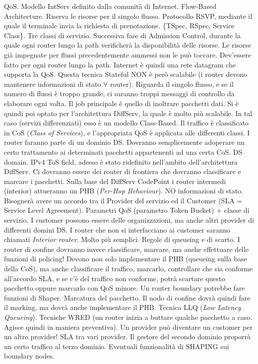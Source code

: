QoS. Modello IntServ definito dalla comunità di Internet. Flow-Based Architecture. Riserva le risorse per il singolo flusso. Protocollo RSVP, mediante il quale il terminale invia la richiesta di prenotazione. \{TSpec, RSpec, Service Class\}. Tre classi di servizio. Successiva fase di Admission Control, durante la quale ogni router lungo la path verificherà la disponibilità delle risorse. Le risorse già impegnate per flussi precedentemente ammessi non le può toccare. Dev'essere fatto per ogni router lungo la path. Internet è quindi una rete datagram che supporta la QoS. Questa tecnica Stateful NON è però scalabile (i router devono mantenere informazioni di stato $\forall$ router). Riguarda il singolo flusso, e se il numero di flussi è troppo grande, ci saranno troppi messaggi di controllo da elaborare ogni volta. Il job principale è quello di inoltrare pacchetti dati. Si è quindi poi optato per l'architettura DiffServ, la quale è molto più scalabile. In tal caso (servizi differenziati) esso è un modello Class-Based. Il traffico è classificato in CoS (\textit{Class of Services}), e l'appropriata QoS è applicata alle differenti classi. I router faranno parte di un dominio DS. Dovranno semplicemente adoperare un certo trattamento ai determinati pacchetti appartenenti ad una certa CoS. DS domain. IPv4 ToS field, adesso è stato ridefinito nell'ambito dell'architettura DiffServ. Ci dovranno essere dei router di frontiera che dovranno classificare e marcare i pacchetti. Sulla base del DiffServ CodePoint i router intermedi (interior) attueranno un PHB (\textit{Per-Hop Behaviour}). NO informazioni di stato. Bisognerà avere un accordo tra il Provider del servizio ed il Customer (SLA = Service Level Agreement). Parametri QoS (parametro Token Bucket) + classe di servizio. I customer possono essere delle organizzazioni, ma anche altri provider di differenti domini DS. I router che non si interfacciano ai customer saranno chiamati \textit{Interior router}. Molto più semplici. Regole di queueing e di scarto. I router di confine dovranno invece classificare, marcare, ma anche effettuare delle funzioni di policing! Devono non solo implementare il PHB (queueing sulla base della CoS), ma anche classificare il traffico, marcarlo, controllare che sia conforme all'accordo SLA, e se c'è del traffico non conforme, potrà scartare questo pacchetto oppure marcarlo con QoS minore. Un router boundary potrebbe fare funzioni di Shaper. Marcatura del pacchetto. Il nodo di confine dovrà quindi fare il marking, ma dovrà anche implementare il PHB. Tecnica LLQ (\textit{Low Latency Queueing}). Tecniche WRED (un router inizia a buttare qualche pacchetto a caso. Agisce quindi in maniera preventiva). Un provider può diventare un customer per un altro provider! SLA tra vari provider. Il gestore del secondo dominio proporrà un certo traffico al terzo dominio. Eventuali funzionalità di SHAPING sui boundary nodes.


